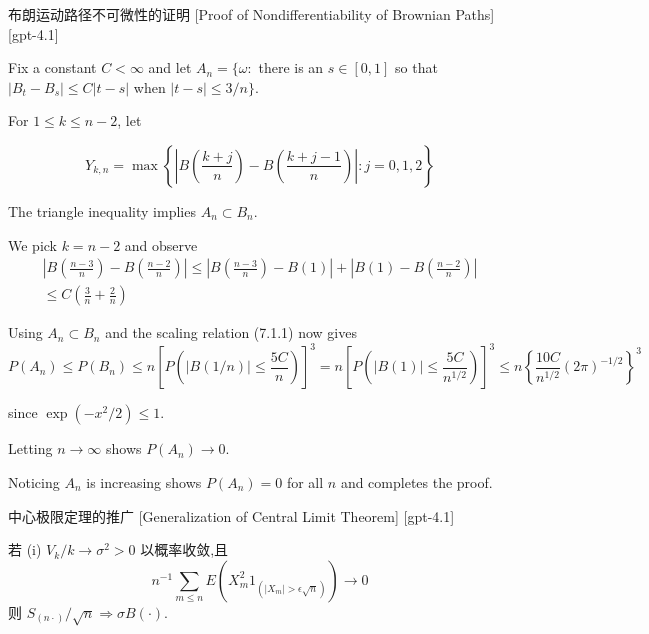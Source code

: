 \documentclass[UTF8]{ctexart}
\begin{document}
    
    
    \begin{prf}
        {布朗运动路径不可微性的证明}
        [Proof of Nondifferentiability of Brownian Paths]
        [gpt-4.1]
        
Fix a constant $C < \infty$ and let $A_{n} = \{\omega :$ there is an $s \in [0,1]$ so that $|B_{t} - B_{s}| \leq C|t - s|$ when $|t - s| \leq 3/n \}$.

For $1 \leq k \leq n-2$, let

\[
Y_{k,n} = \max \left\{ \left| B \left( \frac{k + j}{n} \right) - B \left( \frac{k + j - 1}{n} \right) \right| : j = 0, 1, 2 \right\}
\]

The triangle inequality implies $A_{n} \subset B_{n}$.

We pick $k = n-2$ and observe
\[
\begin{array} { l }
  \displaystyle \left| B\left( \frac{n-3}{n} \right) - B\left( \frac{n-2}{n} \right) \right| \leq \left| B\left( \frac{n-3}{n} \right) - B(1) \right| + \left| B(1) - B\left( \frac{n-2}{n} \right) \right| \\
  \leq C \left( \frac{3}{n} + \frac{2}{n} \right)
\end{array}
\]

Using $A_{n} \subset B_{n}$ and the scaling relation (7.1.1) now gives
\[
P(A_{n}) \leq P(B_{n}) \leq n \left[ P\left( |B(1/n)| \leq \frac{5C}{n} \right) \right]^{3} = n \left[ P\left( |B(1)| \leq \frac{5C}{n^{1/2}} \right) \right]^{3}
  \leq n \left\{ \frac{10C}{n^{1/2}} (2\pi)^{-1/2} \right\}^{3}
\]

since $\exp(-x^{2}/2) \leq 1$.

Letting $n \to \infty$ shows $P(A_{n}) \to 0$.

Noticing $A_{n}$ is increasing shows $P(A_{n}) = 0$ for all $n$ and completes the proof.

    \end{prf}
    
    
    
    \begin{thm}
        {中心极限定理的推广}
        [Generalization of Central Limit Theorem]
        [gpt-4.1]
        
若 (i) $V_{k}/k \to \sigma^{2} > 0$ 以概率收敛,且
\[
n^{-1} \sum_{m \leq n} E ( X_{m}^{2} 1_{( |X_{m}| > \epsilon \sqrt{n} )} ) \to 0
\]
则 $S_{(n \cdot)}/\sqrt{n} \Rightarrow \sigma B(\cdot)$.

    \end{thm}
    
\end{document}
